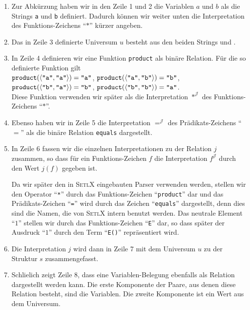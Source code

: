 \begin{enumerate}
\item Zur Abk\"{u}rzung haben wir in den Zeile 1 und 2 die Variablen $a$ und $b$
      als die Strings \texttt{a} und \texttt{b}
      definiert.  Dadurch k\"{o}nnen wir weiter unten die Interpretation des
      Funktions-Zeichens ``$*$'' k\"{u}rzer angeben.
\item Das in Zeile 3 definierte Universum $u$ besteht aus den beiden Strings  und .
\item In Zeile 4 definieren wir eine Funktion \texttt{product} als bin\"{a}re Relation.  F\"{u}r
      die so definierte Funktion gilt
      \\[0.2cm]
      \hspace*{1.3cm}
      $\mathtt{product}(\pair(\quoted{a},\quoted{a})) = \quoted{a}$, \quad
      $\mathtt{product}(\pair(\quoted{a},\quoted{b})) = \quoted{b}$, 
      \\[0.2cm]
      \hspace*{1.3cm}
      $\mathtt{product}(\pair(\quoted{b},\quoted{a})) = \quoted{b}$, \quad
      $\mathtt{product}(\pair(\quoted{b},\quoted{b})) = \quoted{a}$.
      \\[0.2cm]  
      Diese Funktion verwenden wir sp\"{a}ter als die Interpretation $*^\mathcal{J}$ des Funktions-Zeichens ``$*$''.
\item Ebenso haben wir in Zeile 5 die Interpretation $=^\mathcal{J}$ des
      Pr\"{a}dikats-Zeichens ``$=$'' als die bin\"{a}re Relation \texttt{equals} dargestellt. 
\item In Zeile 6 fassen wir die einzelnen Interpretationen zu der Relation $j$
      zusammen, so dass f\"{u}r ein Funktions-Zeichen $f$ die Interpretation $f^\mathcal{J}$ durch
      den Wert $j(f)$ gegeben ist. 

      Da wir sp\"{a}ter den in \textsc{SetlX} eingebauten Parser verwenden werden, stellen wir
      den Operator ``\texttt{*}'' durch das Funktions-Zeichen
      ``\texttt{product}'' dar und das Pr\"{a}dikats-Zeichen ``\texttt{=}'' wird
      durch das Zeichen ``\texttt{equals}'' dargestellt, denn dies sind die
      Namen, die von \textsc{SetlX} intern benutzt werden.  Das neutrale Element ``$1$''
      stellen wir durch das Funktions-Zeichen ``\texttt{E}'' dar, so dass sp\"{a}ter der
      Ausdruck ``$1$'' durch den Term ``\texttt{E()}'' repr\"{a}sentiert wird.
\item Die Interpretation $j$ wird dann in Zeile 7 mit dem
      Universum $u$ zu der Struktur $s$ zusammengefasst.  
\item Schlie\3lich zeigt Zeile 8, dass eine
      Variablen-Belegung ebenfalls als Relation dargestellt werden kann.  Die erste Komponente
      der Paare, aus denen diese Relation besteht, sind die Variablen.  Die zweite Komponente
      ist ein Wert aus dem Universum.
\end{enumerate}


